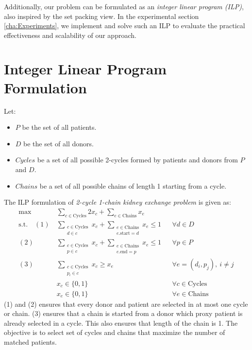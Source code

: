 Additionally, our problem can be formulated as an \emph{integer linear program (ILP)}, also inspired by the set packing view. In the experimental section \autoref{cha:Experiments}, we implement and solve such an ILP to evaluate the practical effectiveness and scalability of our approach.
\section{Integer Linear Program Formulation}

Let:
\begin{itemize}
    \item $P$ be the set of all patients.
    \item $D$ be the set of all donors.
    \item $Cycles$ be a set of all possible 2-cycles formed by patients and donors from $P$ and $D$.
    \item $Chains$ be a set of all possible chains of length 1 starting from a cycle.
\end{itemize}

The ILP formulation of \textit{2-cycle 1-chain kidney exchange problem} is given as:
\begin{align*}
\max\quad & \sum_{c \in \text{Cycles}} 2x_c + \sum_{e \in \text{Chains}} x_e \\
\text{s.t.}\quad 
 (1)\: & \sum_{\substack{c \in \text{Cycles} \\ d \in c}} x_c + \sum_{\substack{e \in \text{Chains} \\ e.\text{start} = d}} x_e \le 1 && \forall d \in D \\
(2)\: & \sum_{\substack{c \in \text{Cycles} \\ p \in c}} x_c + \sum_{\substack{e \in \text{Chains} \\ e.\text{end} = p}} x_e \le 1 && \forall p \in P \\
(3)\: & \sum_{\substack{c \in \text{Cycles} \\ p_i \in c}} x_c \ge x_e && \forall e = (d_i, p_j),\ i \ne j \\
& x_c \in \{0, 1\} && \forall c \in \text{Cycles} \\
& x_e \in \{0, 1\} && \forall e \in \text{Chains}
\end{align*}
\noindent
(1) and (2) ensures that every donor and patient are selected in at most one cycle or chain.
(3) ensures that a chain is started from a donor which proxy patient is already selected in a cycle. This also ensures that length of the chain is 1. The objective is to select set of cycles and chains that maximize the number of matched patients.

